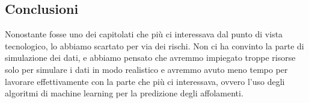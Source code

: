 \documentclass[../studio-di-fattibilita.tex]{subfiles}
\begin{document}
\subsection{Conclusioni}%
\label{sub:Conclusioni}
Nonostante fosse uno dei capitolati che più ci interessava dal punto di vista tecnologico, lo abbiamo scartato per via dei rischi. Non ci ha convinto la parte di simulazione dei dati, e abbiamo pensato che avremmo impiegato troppe risorse solo per simulare i dati in modo realistico e avremmo avuto meno tempo per lavorare effettivamente con la parte che più ci interessava, ovvero l’uso degli algoritmi di machine learning per la predizione degli affolamenti.
\end{document}
